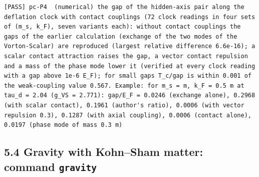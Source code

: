 \documentclass[
  10pt,
]{article}
\begin{document}
\begin{verbatim}
[PASS] pc-P4  (numerical) the gap of the hidden-axis pair along the deflation clock with contact couplings (72 clock readings in four sets of (m_s, k_F), seven variants each): without contact couplings the gaps of the earlier calculation (exchange of the two modes of the Vorton-Scalar) are reproduced (largest relative difference 6.6e-16); a scalar contact attraction raises the gap, a vector contact repulsion and a mass of the phase mode lower it (verified at every clock reading with a gap above 1e-6 E_F); for small gaps T_c/gap is within 0.001 of the weak-coupling value 0.567. Example: for m_s = m, k_F = 0.5 m at tau_d = 2.04 (g_VS = 2.771): gap/E_F = 0.0246 (exchange alone), 0.2968 (with scalar contact), 0.1961 (author's ratio), 0.0006 (with vector repulsion 0.3), 0.1287 (with axial coupling), 0.0006 (contact alone), 0.0197 (phase mode of mass 0.3 m)
\end{verbatim}

\hypertarget{gravity-with-kohnsham-matter-command-gravity}{%
\subsection{\texorpdfstring{5.4 Gravity with Kohn--Sham matter: command
\texttt{gravity}}{5.4 Gravity with Kohn--Sham matter: command gravity}}\label{gravity-with-kohnsham-matter-command-gravity}}
\end{document}
